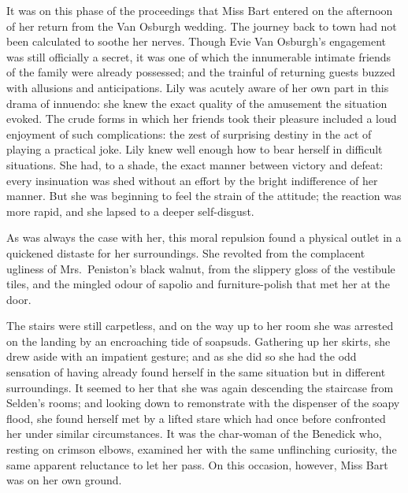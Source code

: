 \documentclass[12pt,a4paper]{book}
\begin{document}
It was on this phase of the proceedings that Miss Bart entered on
the afternoon of her return from the Van Osburgh wedding. The
journey back to town had not been calculated to soothe her
nerves. Though Evie Van Osburgh's engagement was still officially
a secret, it was one of which the innumerable intimate friends of
the family were already possessed; and the trainful of returning
guests buzzed with allusions and anticipations. Lily was acutely
aware of her own part in this drama of innuendo: she knew the
exact quality of the amusement the situation evoked. The crude
forms in which her friends took their pleasure included a loud
enjoyment of such complications: the zest of surprising destiny
in the act of playing a practical joke. Lily knew well enough how
to bear herself in difficult situations. She had, to a shade, the
exact manner between victory and defeat: every insinuation was
shed without an effort by the bright indifference of her manner. 
But she was beginning to feel the strain of the attitude; the
reaction was more rapid, and she lapsed to a deeper self-disgust.






As was always the case with her, this moral repulsion found a
physical outlet in a quickened distaste for her surroundings. 
She revolted from the complacent ugliness of Mrs.\ Peniston's
black walnut, from the slippery gloss of the vestibule tiles,
and the mingled odour of sapolio and furniture-polish that
met her at the door.





The stairs were still carpetless, and on the way up to her room
she was arrested on the landing by an encroaching tide of
soapsuds. Gathering up her skirts, she drew aside with an
impatient gesture; and as she did so she had the odd sensation of
having already found herself in the same situation but in
different surroundings. It seemed to her that she was again
descending the staircase from Selden's rooms; and looking down to
remonstrate with the dispenser of the soapy flood, she found
herself met by a lifted stare which had once before confronted
her under similar circumstances. It was the char-woman of the
Benedick who, resting on crimson elbows, examined her with the
same unflinching curiosity, the same apparent reluctance to let
her pass. On this occasion, however, Miss Bart was on her own
ground.
\end{document}
